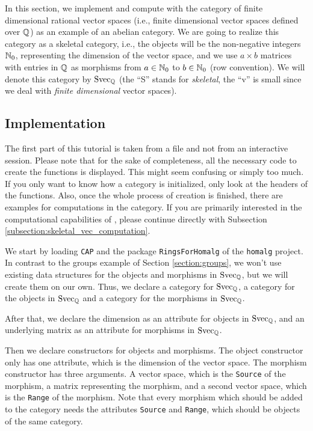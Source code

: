 In this section, we implement and compute with the category of finite dimensional rational vector spaces
(i.e., finite dimensional vector spaces defined over $\mathbb{Q}$) as an
example of an abelian category. We are going
to realize this category as a skeletal category, i.e., the objects will be the non-negative integers $\mathbb{N}_0$,
representing the dimension of the vector space, and we use $a \times b$ matrices with entries in $\mathbb{Q}$ as morphisms
from $a \in \mathbb{N}_0$ to $b \in \mathbb{N}_0$ (row convention). We will denote this category by $\mathrm{Svec}_{\mathbb{Q}}$
(the ``S'' stands for \emph{skeletal}, the ``v'' is small since we deal with \emph{finite dimensional} vector spaces).

\subsection{Implementation}

The first part of this tutorial is taken from a file and not from
an interactive session. Please note that for the sake of completeness, all the necessary code to create the
functions is displayed. This might seem confusing or simply too much. If you only want to know how a \CapPkg category
is initialized, only look at the headers of the functions. Also, once the whole process of creation is finished,
there are examples for computations in the category. If you are primarily interested in the computational capabilities of \CapPkg, please
continue directly with Subsection \ref{subsection:skeletal_vec_computation}.



We start by loading \texttt{CAP} and the package \texttt{RingsForHomalg} of the \texttt{homalg} project.
In contrast to the groups example of Section \ref{section:groups}, we won't use existing data structures for the objects and morphisms
in $\mathrm{Svec}_{\mathbb{Q}}$, but we will create them on our own. Thus, we declare
a \GAP category for $\mathrm{Svec}_{\mathbb{Q}}$, a \GAP category for the objects in $\mathrm{Svec}_{\mathbb{Q}}$ and a \GAP category for the morphisms in $\mathrm{Svec}_{\mathbb{Q}}$.

After that, we declare the dimension as an attribute for objects in $\mathrm{Svec}_{\mathbb{Q}}$,
and an underlying matrix as an attribute for morphisms in $\mathrm{Svec}_{\mathbb{Q}}$.

Then we declare constructors
for objects and morphisms. The object constructor only has one attribute, which is the dimension of the vector space.
The morphism constructor has three arguments. A vector space, which is the \texttt{Source} of the morphism, a matrix
representing the morphism, and a second vector space, which is the \texttt{Range} of the morphism. Note that every morphism
which should be added to the category needs the \GAP attributes \texttt{Source} and \texttt{Range}, which should be
objects of the same category.

